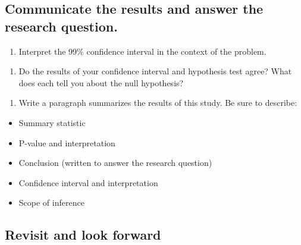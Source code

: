 \documentclass[
]{report}
\providecommand{\tightlist}{%
  \setlength{\itemsep}{0pt}\setlength{\parskip}{0pt}}
\begin{document}
\vspace{.3in}

\hypertarget{communicate-the-results-and-answer-the-research-question.}{%
\subsection*{Communicate the results and answer the research question.}\label{communicate-the-results-and-answer-the-research-question.}}

\begin{enumerate}
\def\labelenumi{\arabic{enumi}.}
\setcounter{enumi}{20}
\tightlist
\item
  Interpret the 99\% confidence interval in the context of the problem.
\end{enumerate}

\vspace{.8in}

\begin{enumerate}
\def\labelenumi{\arabic{enumi}.}
\setcounter{enumi}{21}
\tightlist
\item
  Do the results of your confidence interval and hypothesis test agree? What does each tell you about the null hypothesis?
\end{enumerate}

\vspace{.7in}

\begin{enumerate}
\def\labelenumi{\arabic{enumi}.}
\setcounter{enumi}{22}
\tightlist
\item
  Write a paragraph summarizes the results of this study. Be sure to describe:
\end{enumerate}

\begin{itemize}
\item
  Summary statistic
\item
  P-value and interpretation
\item
  Conclusion (written to answer the research question)
\item
  Confidence interval and interpretation
\item
  Scope of inference
\end{itemize}

\vspace{3in}

\hypertarget{revisit-and-look-forward}{%
\subsection*{Revisit and look forward}\label{revisit-and-look-forward}}
\end{document}
